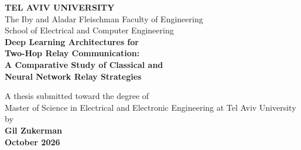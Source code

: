 \documentclass[12pt,a4paper,oneside]{book}
\theoremstyle{definition}
\begin{document}
\hypersetup{pageanchor=false}
\begin{titlepage}
\begin{center}
\vspace*{0.5cm}
{\LARGE\textbf{TEL AVIV UNIVERSITY}}\\[6pt]
{\large The Iby and Aladar Fleischman Faculty of Engineering}\\[4pt]
{\large School of Electrical and Computer Engineering}\\[2cm]

{\LARGE\bfseries
Deep Learning Architectures for\\
Two-Hop Relay Communication:\\
A Comparative Study of Classical and\\
Neural Network Relay Strategies\\[2cm]
}

{\large A thesis submitted toward the degree of}\\
{\large Master of Science in Electrical and Electronic Engineering \newline at Tel Aviv University}\\[1.5cm]

{\large by}\\[6pt]
{\Large\bfseries Gil Zukerman}\\[1.5cm]
\vfill
{\large\textbf{October 2026}}\\[1.5cm]


\end{center}
\end{titlepage}
\end{document}
